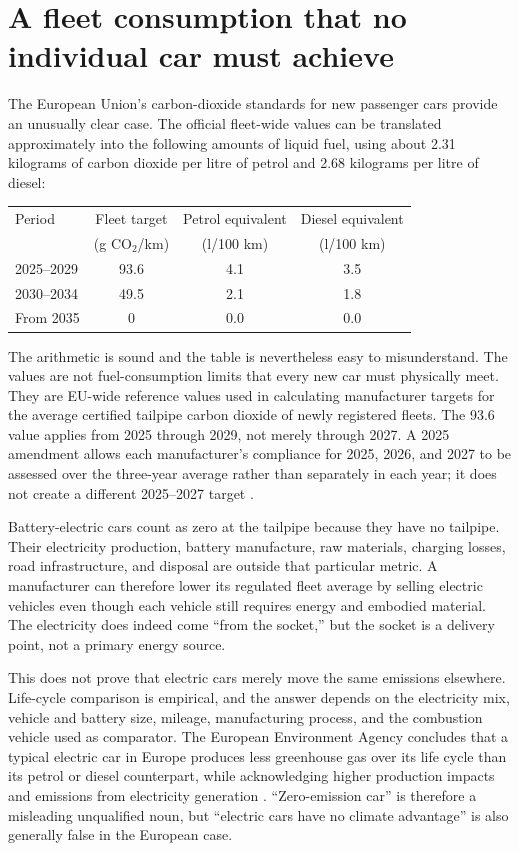 ﻿\documentclass[12pt,a4paper]{book}
\begin{document}
\section{A fleet consumption that no individual car must achieve}

The European Union's carbon-dioxide standards for new passenger cars provide
an unusually clear case.  The official fleet-wide values can be translated
approximately into the following amounts of liquid fuel, using about
2.31 kilograms of carbon dioxide per litre of petrol and 2.68 kilograms per
litre of diesel:

\begin{center}
\begin{tabular}{lccc}
\hline
Period & Fleet target & Petrol equivalent & Diesel equivalent \\
       & (g CO$_2$/km) & (l/100 km) & (l/100 km) \\
\hline
2025--2029 & 93.6 & 4.1 & 3.5 \\
2030--2034 & 49.5 & 2.1 & 1.8 \\
From 2035 & 0 & 0.0 & 0.0 \\
\hline
\end{tabular}
\end{center}

The arithmetic is sound and the table is nevertheless easy to misunderstand.
The values are not fuel-consumption limits that every new car must physically
meet.  They are EU-wide reference values used in calculating manufacturer
targets for the average certified tailpipe carbon dioxide of newly registered
fleets.  The 93.6 value applies from 2025 through 2029, not merely through
2027.  A 2025 amendment allows each manufacturer's compliance for 2025, 2026,
and 2027 to be assessed over the three-year average rather than separately in
each year; it does not create a different 2025--2027 target
\cite{EUCarCO2Standards,EUCarFlexibility2025}.

Battery-electric cars count as zero at the tailpipe because they have no
tailpipe.  Their electricity production, battery manufacture, raw materials,
charging losses, road infrastructure, and disposal are outside that particular
metric.  A manufacturer can therefore lower its regulated fleet average by
selling electric vehicles even though each vehicle still requires energy and
embodied material.  The electricity does indeed come ``from the socket,'' but
the socket is a delivery point, not a primary energy source.

This does not prove that electric cars merely move the same emissions
elsewhere.  Life-cycle comparison is empirical, and the answer depends on the
electricity mix, vehicle and battery size, mileage, manufacturing process, and
the combustion vehicle used as comparator.  The European Environment Agency
concludes that a typical electric car in Europe produces less greenhouse gas
over its life cycle than its petrol or diesel counterpart, while acknowledging
higher production impacts and emissions from electricity generation
\cite{EEAElectricVehiclesLifecycle}.  ``Zero-emission car'' is therefore a
misleading unqualified noun, but ``electric cars have no climate advantage''
is also generally false in the European case.
\end{document}
